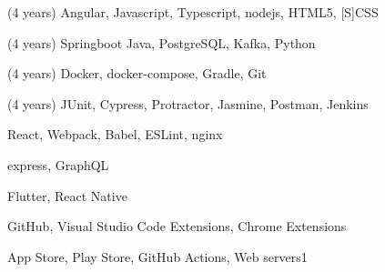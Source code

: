 
\begin{cvskills}

  {(4 years) Angular, Javascript, Typescript, nodejs, HTML5, [S]CSS}

  {(4 years) Springboot Java, PostgreSQL, Kafka, Python}

  {(4 years) Docker, docker-compose, Gradle, Git}

  {(4 years) JUnit, Cypress, Protractor, Jasmine, Postman, Jenkins}\\



  {React, Webpack, Babel, ESLint, nginx}

  {express, GraphQL}

  {Flutter, React Native}

  {GitHub, Visual Studio Code Extensions, Chrome Extensions}

  {App Store, Play Store, GitHub Actions, Web servers1}

\end{cvskills}
